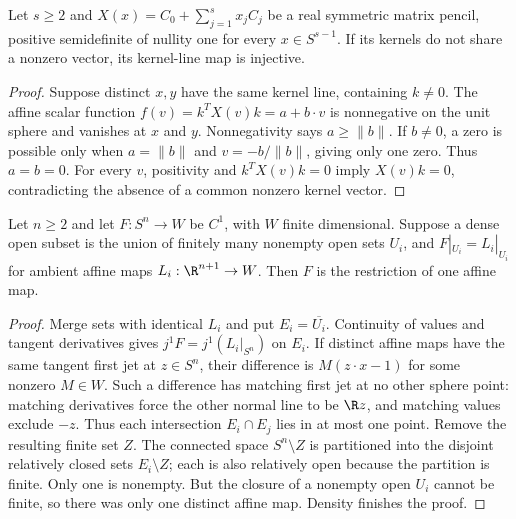 \begin{lemma}
\label{lem:affine-kernel-injective}
Let $s\geq2$ and $X(x)=C_0+\sum_{j=1}^s x_jC_j$ be a real symmetric
matrix pencil, positive semidefinite of nullity one for every
$x\in S^{s-1}$. If its kernels do not share a nonzero vector, its
kernel-line map is injective.
\end{lemma}
\begin{proof}
Suppose distinct $x,y$ have the same kernel line, containing $k\ne0$.
The affine scalar function $f(v)=k^TX(v)k=a+b\cdot v$ is nonnegative on
the unit sphere and vanishes at $x$ and $y$. Nonnegativity says
$a\geq\|b\|$. If $b\ne0$, a zero is possible only when
$a=\|b\|$ and $v=-b/\|b\|$, giving only one zero. Thus $a=b=0$.
For every $v$, positivity and $k^TX(v)k=0$ imply $X(v)k=0$, contradicting
the absence of a common nonzero kernel vector.
\end{proof}

\begin{lemma}
\label{lem:finite-affine-selection}
Let $n\geq2$ and let $F:S^n\to W$ be $C^1$, with $W$ finite dimensional.
Suppose a dense open subset is the union of finitely many nonempty open
sets $U_i$, and $F|_{U_i}=L_i|_{U_i}$ for ambient affine maps
$L_i:\R^{n+1}\to W$. Then $F$ is the restriction of one affine map.
\end{lemma}
\begin{proof}
Merge sets with identical $L_i$ and put $E_i=\overline{U_i}$. Continuity
of values and tangent derivatives gives $j^1F=j^1(L_i|_{S^n})$ on $E_i$.
If distinct affine maps have the same tangent first jet at $z\in S^n$,
their difference is $M(z\cdot x-1)$ for some nonzero $M\in W$.
Such a difference has matching first jet at no other sphere point:
matching derivatives force the other normal line to be $\R z$, and
matching values exclude $-z$. Thus each intersection $E_i\cap E_j$ lies
in at most one point. Remove the resulting finite set $Z$. The connected
space $S^n\setminus Z$ is partitioned into the disjoint relatively closed
sets $E_i\setminus Z$; each is also relatively open because the partition
is finite. Only one is nonempty. But the closure of a nonempty open $U_i$
cannot be finite, so there was only one distinct affine map. Density
finishes the proof.
\end{proof}

